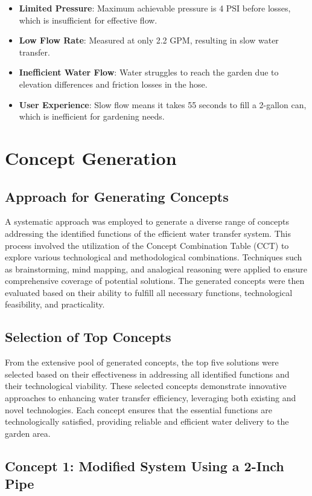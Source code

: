 \documentclass[12pt]{report}
\begin{document}
\begin{itemize}
    \item \textbf{Limited Pressure}: Maximum achievable pressure is 4 PSI before losses, which is insufficient for effective flow.
    \item \textbf{Low Flow Rate}: Measured at only 2.2 GPM, resulting in slow water transfer.
    \item \textbf{Inefficient Water Flow}: Water struggles to reach the garden due to elevation differences and friction losses in the hose.
    \item \textbf{User Experience}: Slow flow means it takes 55 seconds to fill a 2-gallon can, which is inefficient for gardening needs.
\end{itemize}
\newpage
\section{Concept Generation}

\subsection{Approach for Generating Concepts}
A systematic approach was employed to generate a diverse range of concepts addressing the identified functions of the efficient water transfer system. This process involved the utilization of the Concept Combination Table (CCT) to explore various technological and methodological combinations. Techniques such as brainstorming, mind mapping, and analogical reasoning were applied to ensure comprehensive coverage of potential solutions. The generated concepts were then evaluated based on their ability to fulfill all necessary functions, technological feasibility, and practicality.

\subsection{Selection of Top Concepts}
From the extensive pool of generated concepts, the top five solutions were selected based on their effectiveness in addressing all identified functions and their technological viability. These selected concepts demonstrate innovative approaches to enhancing water transfer efficiency, leveraging both existing and novel technologies. Each concept ensures that the essential functions are technologically satisfied, providing reliable and efficient water delivery to the garden area.


\subsection{Concept 1: Modified System Using a 2-Inch Pipe}
\end{document}
